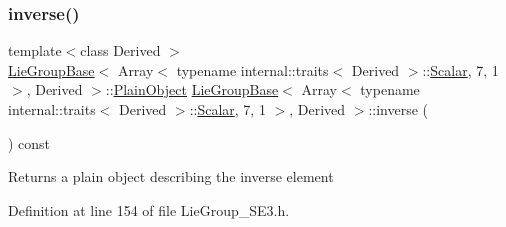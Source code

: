 \subsubsection{\texorpdfstring{inverse()}{inverse()}}
{\footnotesize\ttfamily template$<$class Derived $>$ \\
\hyperlink{class_lie_group_base}{Lie\+Group\+Base}$<$ Array$<$ typename internal\+::traits$<$ Derived $>$\+::\hyperlink{class_lie_group_base_3_01_array_3_01typename_01internal_1_1traits_3_01_derived_01_4_1_1_scalar_0d6d4b5459662fc32c7117aee50362fb1_a831695c575380c9a1df32eff9fc4a8c6}{Scalar}, 7, 1 $>$, Derived $>$\+::\hyperlink{class_lie_group_base_3_01_array_3_01typename_01internal_1_1traits_3_01_derived_01_4_1_1_scalar_0d6d4b5459662fc32c7117aee50362fb1_a950a48c9e027bcd00193aa20a59ee723}{Plain\+Object} \hyperlink{class_lie_group_base}{Lie\+Group\+Base}$<$ Array$<$ typename internal\+::traits$<$ Derived $>$\+::\hyperlink{class_lie_group_base_3_01_array_3_01typename_01internal_1_1traits_3_01_derived_01_4_1_1_scalar_0d6d4b5459662fc32c7117aee50362fb1_a831695c575380c9a1df32eff9fc4a8c6}{Scalar}, 7, 1 $>$, Derived $>$\+::inverse (\begin{DoxyParamCaption}{ }\end{DoxyParamCaption}) const}

\begin{DoxyReturn}{Returns}
a plain object describing the inverse element 
\end{DoxyReturn}


Definition at line 154 of file Lie\+Group\+\_\+\+S\+E3.\+h.

\hypertarget{class_lie_group_base_3_01_array_3_01typename_01internal_1_1traits_3_01_derived_01_4_1_1_scalar_0d6d4b5459662fc32c7117aee50362fb1_a788a15627058958f796bfb0f5226b0ab}{}\label{class_lie_group_base_3_01_array_3_01typename_01internal_1_1traits_3_01_derived_01_4_1_1_scalar_0d6d4b5459662fc32c7117aee50362fb1_a788a15627058958f796bfb0f5226b0ab} 
